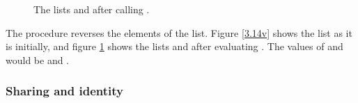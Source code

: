 \begin{exe}[3.14]
\begin{figure}
        \caption{The lists  and  after calling .}
        \label{3.14w}
    \end{figure}
    The  procedure reverses the elements of the list. Figure 
    \ref{3.14v} shows the list  as it is initially, and figure 
    \ref{3.14w} shows the lists  and  after evaluating 
    . The values of  and  would be 
     and .
\end{exe}

\subsubsection{Sharing and identity}

